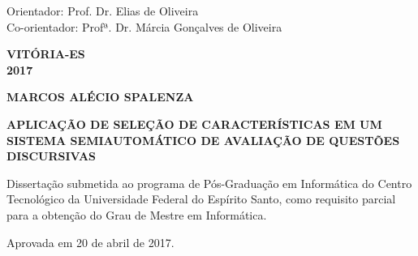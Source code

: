 \par
\vspace{1em}
\hspace*{175pt}\parbox{10cm}{{Orientador: Prof. Dr. Elias de Oliveira}\\{Co-orientador: Profª. Dr. Márcia Gonçalves de Oliveira}}

\par
\vfill
\begin{center}
\textbf{{\large VITÓRIA-ES}\\
{\large 2017}}
\end{center}









\newpage











\newpage
\begin{center}

{%
\bfseries
\fontsize{14}{16}\selectfont
MARCOS ALÉCIO SPALENZA
}
\vspace{0.5cm}

{
\bfseries
\fontsize{15}{17}\selectfont
\MakeUppercase{{APLICAÇÃO DE SELEÇÃO DE CARACTERÍSTICAS EM UM SISTEMA SEMIAUTOMÁTICO DE AVALIAÇÃO DE QUESTÕES DISCURSIVAS}}\\
}

\vspace{0.5cm}
\end{center}
{
\fontsize{12}{14}\selectfont
Dissertação submetida ao programa de Pós-Graduação em Informática do Centro Tecnológico da Universidade Federal do Espírito Santo, como
requisito parcial para a obtenção do Grau de Mestre em Informática.}


\begin{flushright}
{
\fontsize{12}{14}\selectfont
Aprovada em 20 de abril de 2017.}
\end{flushright}

\vspace{0.5cm}


